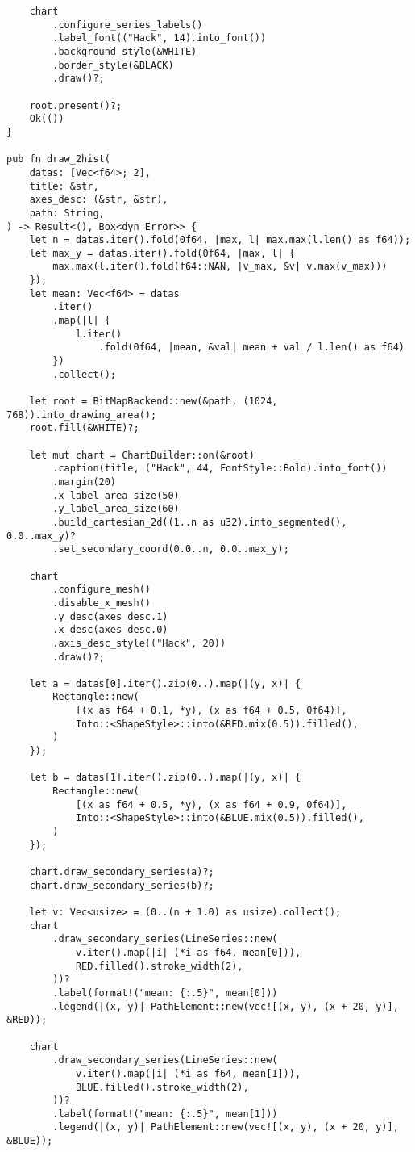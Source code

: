 \begin{verbatim}
    chart
        .configure_series_labels()
        .label_font(("Hack", 14).into_font())
        .background_style(&WHITE)
        .border_style(&BLACK)
        .draw()?;

    root.present()?;
    Ok(())
}

pub fn draw_2hist(
    datas: [Vec<f64>; 2],
    title: &str,
    axes_desc: (&str, &str),
    path: String,
) -> Result<(), Box<dyn Error>> {
    let n = datas.iter().fold(0f64, |max, l| max.max(l.len() as f64));
    let max_y = datas.iter().fold(0f64, |max, l| {
        max.max(l.iter().fold(f64::NAN, |v_max, &v| v.max(v_max)))
    });
    let mean: Vec<f64> = datas
        .iter()
        .map(|l| {
            l.iter()
                .fold(0f64, |mean, &val| mean + val / l.len() as f64)
        })
        .collect();

    let root = BitMapBackend::new(&path, (1024, 768)).into_drawing_area();
    root.fill(&WHITE)?;

    let mut chart = ChartBuilder::on(&root)
        .caption(title, ("Hack", 44, FontStyle::Bold).into_font())
        .margin(20)
        .x_label_area_size(50)
        .y_label_area_size(60)
        .build_cartesian_2d((1..n as u32).into_segmented(), 0.0..max_y)?
        .set_secondary_coord(0.0..n, 0.0..max_y);

    chart
        .configure_mesh()
        .disable_x_mesh()
        .y_desc(axes_desc.1)
        .x_desc(axes_desc.0)
        .axis_desc_style(("Hack", 20))
        .draw()?;

    let a = datas[0].iter().zip(0..).map(|(y, x)| {
        Rectangle::new(
            [(x as f64 + 0.1, *y), (x as f64 + 0.5, 0f64)],
            Into::<ShapeStyle>::into(&RED.mix(0.5)).filled(),
        )
    });

    let b = datas[1].iter().zip(0..).map(|(y, x)| {
        Rectangle::new(
            [(x as f64 + 0.5, *y), (x as f64 + 0.9, 0f64)],
            Into::<ShapeStyle>::into(&BLUE.mix(0.5)).filled(),
        )
    });

    chart.draw_secondary_series(a)?;
    chart.draw_secondary_series(b)?;

    let v: Vec<usize> = (0..(n + 1.0) as usize).collect();
    chart
        .draw_secondary_series(LineSeries::new(
            v.iter().map(|i| (*i as f64, mean[0])),
            RED.filled().stroke_width(2),
        ))?
        .label(format!("mean: {:.5}", mean[0]))
        .legend(|(x, y)| PathElement::new(vec![(x, y), (x + 20, y)], &RED));

    chart
        .draw_secondary_series(LineSeries::new(
            v.iter().map(|i| (*i as f64, mean[1])),
            BLUE.filled().stroke_width(2),
        ))?
        .label(format!("mean: {:.5}", mean[1]))
        .legend(|(x, y)| PathElement::new(vec![(x, y), (x + 20, y)], &BLUE));


\end{verbatim}

